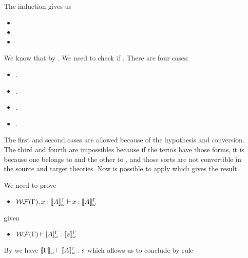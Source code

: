 \begin{Proof}
\begin{ProofCase}{\CicConv}
The induction gives us
\begin{itemize}
\item {}
\item {}
\item {}
\end{itemize}
We know that  by 
.
We need to check if .
There are four cases:
\begin{itemize}
\item {}.
\item {}.
\item {}.
\item {}.
\end{itemize}
The first and second cases are allowed because of the hypothesis and conversion. The third and fourth are 
impossibles because if the terms have those forms, it is because one belongs to \Prop{} and the other 
to \Type{}, and those sorts are not convertible in the source and target theories.
Now is possible to apply \CicConv{} which gives the result.
\end{ProofCase}

\begin{ProofCase}{\CicIdem}
We need to prove
\begin{itemize}
\item $\ctyping[\typing{x}{\WTypeTrans{A}}][\wfContext{\Context}]{x}{\WTypeTrans{A}}$
\end{itemize}
given
\begin{itemize}
\item $\ctyping[][\wfContext{\Context}]{\WTrans{A}}{\WTypeTrans{s}}$
\end{itemize}
By  we have 
$\ctyping[][\WContextTrans{\Context}]{\WTypeTrans{A}}{s}$ which allows us to conclude
by \CicIdem{} rule
\end{ProofCase}

\end{Proof}